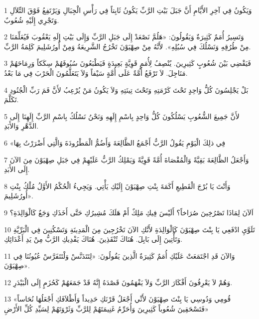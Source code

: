 \par 1 وَيَكُونُ فِي آخِرِ الأَيَّامِ أَنَّ جَبَلَ بَيْتِ الرَّبِّ يَكُونُ ثَابِتاً فِي رَأْسِ الْجِبَالِ وَيَرْتَفِعُ فَوْقَ التِّلاَلِ وَتَجْرِي إِلَيْهِ شُعُوبٌ.
\par 2 وَتَسِيرُ أُمَمٌ كَثِيرَةٌ وَيَقُولُونَ: «هَلُمَّ نَصْعَدْ إِلَى جَبَلِ الرَّبِّ وَإِلَى بَيْتِ إِلَهِ يَعْقُوبَ فَيُعَلِّمَنَا مِنْ طُرُقِهِ وَنَسْلُكَ فِي سُبُلِهِ». لأَنَّهُ مِنْ صِهْيَوْنَ تَخْرُجُ الشَّرِيعَةُ وَمِنْ أُورُشَلِيمَ كَلِمَةُ الرَّبِّ.
\par 3 فَيَقْضِي بَيْنَ شُعُوبٍ كَثِيرِينَ. يُنْصِفُ لِأُمَمٍ قَوِيَّةٍ بَعِيدَةٍ فَيَطْبَعُونَ سُيُوفَهُمْ سِكَكاً وَرِمَاحَهُمْ مَنَاجِلَ. لاَ تَرْفَعُ أُمَّةٌ عَلَى أُمَّةٍ سَيْفاً وَلاَ يَتَعَلَّمُونَ الْحَرْبَ فِي مَا بَعْدُ.
\par 4 بَلْ يَجْلِسُونَ كُلُّ وَاحِدٍ تَحْتَ كَرْمَتِهِ وَتَحْتَ تِينَتِهِ وَلاَ يَكُونُ مَنْ يُرْعِبُ لأَنَّ فَمَ رَبِّ الْجُنُودِ تَكَلَّمَ.
\par 5 لأَنَّ جَمِيعَ الشُّعُوبِ يَسْلُكُونَ كُلُّ وَاحِدٍ بِاسْمِ إِلَهِهِ وَنَحْنُ نَسْلُكُ بِاسْمِ الرَّبِّ إِلَهِنَا إِلَى الدَّهْرِ وَالأَبَدِ.
\par 6 «فِي ذلِكَ الْيَوْمِ يَقُولُ الرَّبُّ أَجْمَعُ الظَّالِعَةَ وَأَضُمُّ الْمَطْرُودَةَ وَالَّتِي أَضْرَرْتُ بِهَا
\par 7 وَأَجْعَلُ الظَّالِعَةَ بَقِيَّةً وَالْمُقْصَاةَ أُمَّةً قَوِيَّةً وَيَمْلِكُ الرَّبُّ عَلَيْهِمْ فِي جَبَلِ صِهْيَوْنَ مِنَ الآنَ إِلَى الأَبَدِ.
\par 8 وَأَنْتَ يَا بُرْجَ الْقَطِيعِ أَكَمَةَ بِنْتِ صِهْيَوْنَ إِلَيْكِ يَأْتِي. وَيَجِيءُ الْحُكْمُ الأَوَّلُ مُلْكُ بِنْتِ أُورُشَلِيمَ».
\par 9 اَلآنَ لِمَاذَا تَصْرُخِينَ صُرَاخاً؟ أَلَيْسَ فِيكِ مَلِكٌ أَمْ هَلَكَ مُشِيرُكِ حَتَّى أَخَذَكِ وَجَعٌ كَالْوَالِدَةِ؟
\par 10 تَلَوَّيِ ادْفَعِي يَا بِنْتَ صِهْيَوْنَ كَالْوَالِدَةِ لأَنَّكِ الآنَ تَخْرُجِينَ مِنَ الْمَدِينَةِ وَتَسْكُنِينَ فِي الْبَرِّيَّةِ وَتَأْتِينَ إِلَى بَابِلَ. هُنَاكَ تُنْقَذِينَ. هُنَاكَ يَفْدِيكِ الرَّبُّ مِنْ يَدِ أَعْدَائِكِ.
\par 11 وَالآنَ قَدِ اجْتَمَعَتْ عَلَيْكِ أُمَمٌ كَثِيرَةٌ الَّذِينَ يَقُولُونَ: «لِتَتَدَنَّسْ وَلْتَتَفَرَّسْ عُيُونُنَا فِي صِهْيَوْنَ».
\par 12 وَهُمْ لاَ يَعْرِفُونَ أَفْكَارَ الرَّبِّ وَلاَ يَفْهَمُونَ قَصْدَهُ إِنَّهُ قَدْ جَمَعَهُمْ كَحُزَمٍ إِلَى الْبَيْدَرِ.
\par 13 «قُومِي وَدُوسِي يَا بِنْتَ صِهْيَوْنَ لأَنِّي أَجْعَلُ قَرْنَكِ حَدِيداً وَأَظْلاَفَكِ أَجْعَلُهَا نُحَاساً فَتَسْحَقِينَ شُعُوباً كَثِيرِينَ وَأُحَرِّمُ غَنِيمَتَهُمْ لِلرَّبِّ وَثَرْوَتَهُمْ لِسَيِّدِ كُلِّ الأَرْضِ»

